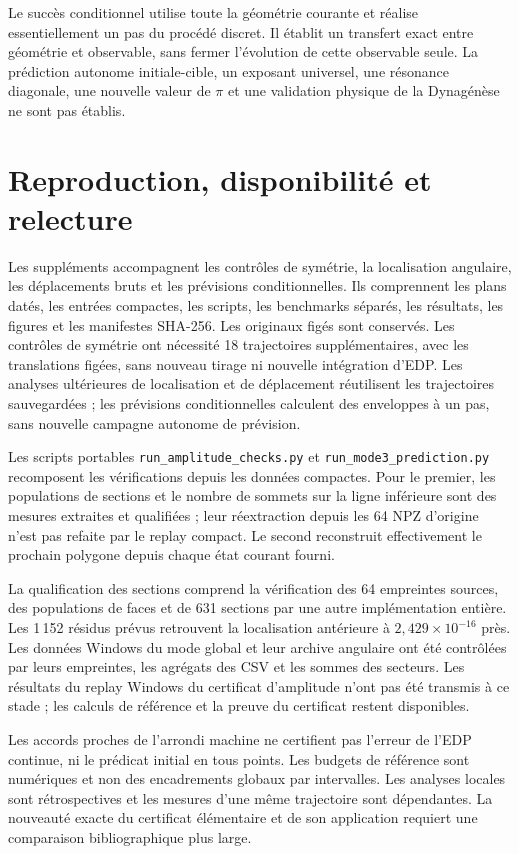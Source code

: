 \documentclass[11pt,a4paper]{article}
\newcommand{\sci}[2]{#1\times10^{#2}}
\begin{document}
Le succès conditionnel utilise toute la géométrie courante et réalise essentiellement un pas du procédé discret. Il établit un transfert exact entre géométrie et observable, sans fermer l'évolution de cette observable seule. La prédiction autonome initiale-cible, un exposant universel, une résonance diagonale, une nouvelle valeur de $\pi$ et une validation physique de la Dynagénèse ne sont pas établis.

\newpage
\section{Reproduction, disponibilité et relecture}
Les suppléments accompagnent les contrôles de symétrie, la localisation angulaire, les déplacements bruts et les prévisions conditionnelles. Ils comprennent les plans datés, les entrées compactes, les scripts, les benchmarks séparés, les résultats, les figures et les manifestes SHA-256. Les originaux figés sont conservés. Les contrôles de symétrie ont nécessité 18 trajectoires supplémentaires, avec les translations figées, sans nouveau tirage ni nouvelle intégration d'EDP. Les analyses ultérieures de localisation et de déplacement réutilisent les trajectoires sauvegardées ; les prévisions conditionnelles calculent des enveloppes à un pas, sans nouvelle campagne autonome de prévision.

Les scripts portables \texttt{run\_amplitude\_checks.py} et \texttt{run\_mode3\_prediction.py} recomposent les vérifications depuis les données compactes. Pour le premier, les populations de sections et le nombre de sommets sur la ligne inférieure sont des mesures extraites et qualifiées ; leur réextraction depuis les 64 NPZ d'origine n'est pas refaite par le replay compact. Le second reconstruit effectivement le prochain polygone depuis chaque état courant fourni.

La qualification des sections comprend la vérification des 64 empreintes sources, des populations de faces et de 631 sections par une autre implémentation entière. Les 1\,152 résidus prévus retrouvent la localisation antérieure à $\sci{2{,}429}{-16}$ près. Les données Windows du mode global et leur archive angulaire ont été contrôlées par leurs empreintes, les agrégats des CSV et les sommes des secteurs. Les résultats du replay Windows du certificat d'amplitude n'ont pas été transmis à ce stade ; les calculs de référence et la preuve du certificat restent disponibles.

Les accords proches de l'arrondi machine ne certifient pas l'erreur de l'EDP continue, ni le prédicat initial en tous points. Les budgets de référence sont numériques et non des encadrements globaux par intervalles. Les analyses locales sont rétrospectives et les mesures d'une même trajectoire sont dépendantes. La nouveauté exacte du certificat élémentaire et de son application requiert une comparaison bibliographique plus large.
\end{document}
